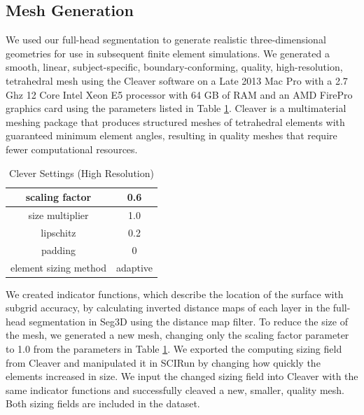 \subsection{Mesh Generation}
\label{sec:mesh}


We used our full-head segmentation to generate realistic three-dimensional geometries for use in subsequent finite element simulations. We generated a smooth, linear, subject-specific, boundary-conforming, quality, high-resolution, tetrahedral mesh using the Cleaver software \cite{ref:cleaver} on a Late 2013 Mac Pro with a 2.7 Ghz 12 Core Intel Xeon E5 processor with 64 GB of RAM and an AMD FirePro graphics card using the parameters listed in Table \ref{tab:cleaver}. Cleaver is a multimaterial meshing package that produces structured meshes of tetrahedral elements with guaranteed minimum element angles, resulting in quality meshes that require fewer computational resources. 

\begin{table}[H]
\centering
\caption{Clever Settings (High Resolution)}
\label{tab:cleaver}
\begin{tabular}{|c|c|}
\hline
scaling factor                    & 0.6                 \\ \hline
size multiplier                   & 1.0                 \\ \hline
lipschitz                         & 0.2                 \\ \hline
padding                           & 0                   \\ \hline
element sizing method             & adaptive            \\ \hline
\end{tabular}
\end{table}

We created indicator functions, which describe the location of the surface with subgrid accuracy, by calculating inverted distance maps of each layer in the full-head segmentation in Seg3D using the distance map filter. To reduce the size of the mesh, we generated a new mesh, changing only the scaling factor parameter to 1.0 from the parameters in Table \ref{tab:cleaver}. We exported the computing sizing field from Cleaver and manipulated it in SCIRun by changing how quickly the elements increased in size. We input the changed sizing field into Cleaver with the same indicator functions and successfully cleaved a new, smaller, quality mesh. Both sizing fields are included in the dataset.

